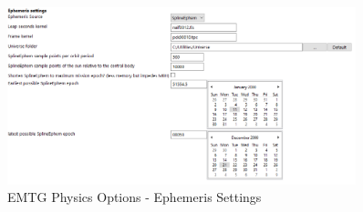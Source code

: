    \begin{figure}[H]
        \centering
        \includegraphics[width=0.9\textwidth]{../../shared_latex_inputs/images/pyemtg_physics-ephem_options.png}
        \caption{EMTG Physics Options - Ephemeris Settings}
    \end{figure}

